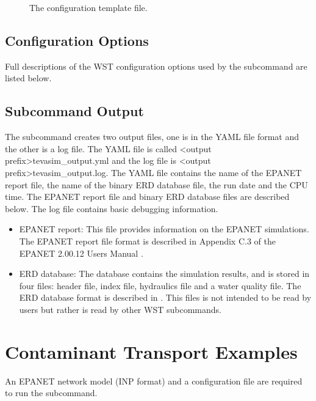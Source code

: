 \begin{figure}[h]
  \caption{The  configuration template file.}
  \label{fig:tevasim_template}
\end{figure}
  
\subsection{Configuration Options}

Full descriptions of the WST configuration options used by the  subcommand are listed below.


\subsection{Subcommand Output}

The  subcommand creates 
two output files, one is in the YAML file format and the other is a log file.
The YAML file is called <output prefix>tevasim\_output.yml  
and the log file is <output prefix>tevasim\_output.log. The YAML file 
contains the name of the EPANET report file, the name of the binary ERD database file, 
the run date and the CPU time. 
The EPANET report file and binary ERD database files are described below.
The log file contains basic debugging information.

\begin{itemize}
\item EPANET report: This file provides information on the EPANET simulations. 
The EPANET report file format is described in Appendix C.3 of the EPANET 2.00.12 Users Manual \citep{EPANETusermanual}.
\item ERD database: The database contains the simulation results, 
and is stored in four files: header file, index file, hydraulics file and a water 
quality file. The ERD database format is described in \citet{ERDusermanual}. This files is not
intended to be read by users but rather is read by other WST subcommands.
\end{itemize}

\section{Contaminant Transport Examples}\label{tevasim_example}

An EPANET network model (INP format) and a configuration file are required to 
run the  subcommand.  

